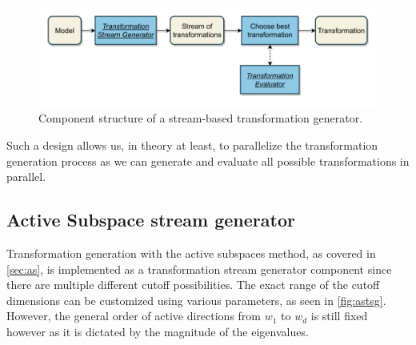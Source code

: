 \documentclass[
  a4paper,  %
  twoside,  %
  bibliography=totoc,
  headsepline,
  cleardoublepage=empty,
  parskip=half,
  draft=false
]{scrbook}
\begin{document}
\begin{mdframed}[style=style,frametitle={Transformation generator (stream-based)}]
\begin{figure}[H]
\includegraphics[width=\textwidth]{graphics/TransformationGen_Stream.pdf}
\delimit
\caption{Component structure of a stream-based transformation generator.}
\label{fig:tsg}
\end{figure}
\end{mdframed}
%
Such a design allows us, in theory at least, to parallelize the transformation generation process as we can generate and evaluate all possible transformations in parallel.

\newpage
\subsection{Active Subspace stream generator}

Transformation generation with the active subspaces method, as covered in \cref{sec:as}, is implemented as a transformation stream generator component since there are multiple different cutoff possibilities.
The exact range of the cutoff dimensions can be customized using various parameters, as seen in \cref{fig:astsg}.
However, the general order of active directions from $w_1$ to $w_d$ is still fixed however as it is dictated by the magnitude of the eigenvalues.
\end{document}
